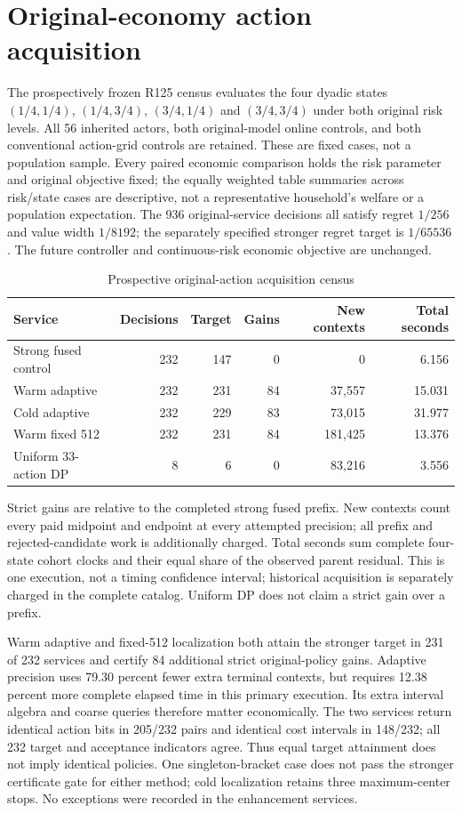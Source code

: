 \section{Original-economy action acquisition}
\label{sec:results125}
The prospectively frozen R125 census evaluates the four dyadic states $(1/4,1/4)$, $(1/4,3/4)$, $(3/4,1/4)$ and $(3/4,3/4)$ under both original risk levels. All 56 inherited actors, both original-model online controls, and both conventional action-grid controls are retained. These are fixed cases, not a population sample. Every paired economic comparison holds the risk parameter and original objective fixed; the equally weighted table summaries across risk/state cases are descriptive, not a representative household's welfare or a population expectation. The 936 original-service decisions all satisfy regret $1/256$ and value width $1/8192$; the separately specified stronger regret target is $1/65536$. The future controller and continuous-risk economic objective are unchanged.
\begin{table}[t]
\centering\small
\caption{Prospective original-action acquisition census}
\label{tab:acquisition125}
\begin{tabular}{lrrrrr}
\hline
Service & Decisions & Target & Gains & New contexts & Total seconds \\
\hline
Strong fused control & 232 & 147 & 0 & 0 & 6.156 \\
Warm adaptive & 232 & 231 & 84 & 37,557 & 15.031 \\
Cold adaptive & 232 & 229 & 83 & 73,015 & 31.977 \\
Warm fixed 512 & 232 & 231 & 84 & 181,425 & 13.376 \\
Uniform 33-action DP & 8 & 6 & 0 & 83,216 & 3.556 \\
\hline
\end{tabular}
\par\smallskip\parbox{0.96\textwidth}{\footnotesize Strict gains are relative to the completed strong fused prefix. New contexts count every paid midpoint and endpoint at every attempted precision; all prefix and rejected-candidate work is additionally charged. Total seconds sum complete four-state cohort clocks and their equal share of the observed parent residual. This is one execution, not a timing confidence interval; historical acquisition is separately charged in the complete catalog. Uniform DP does not claim a strict gain over a prefix.}
\end{table}
Warm adaptive and fixed-512 localization both attain the stronger target in 231 of 232 services and certify 84 additional strict original-policy gains. Adaptive precision uses 79.30 percent fewer extra terminal contexts, but requires 12.38 percent more complete elapsed time in this primary execution. Its extra interval algebra and coarse queries therefore matter economically. The two services return identical action bits in 205/232 pairs and identical cost intervals in 148/232; all 232 target and acceptance indicators agree. Thus equal target attainment does not imply identical policies. One singleton-bracket case does not pass the stronger certificate gate for either method; cold localization retains three maximum-center stops. No exceptions were recorded in the enhancement services.
